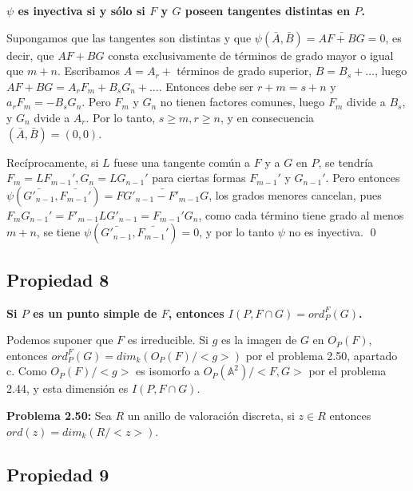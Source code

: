 \textbf{$\psi$ es inyectiva si y sólo si $F$ y $G$ poseen tangentes distintas en $P$.}

\begin{Dem}
  Supongamos que las tangentes son distintas y que $\psi(\bar{A},\bar{B}) = \bar{AF+BG}=0$, es decir, que $AF+BG$ consta exclusivamente de términos de grado mayor o igual que $m+n$. Escribamos $A=A_r+$ términos de grado superior, $B=B_s+\dots$, luego $AF+BG=A_rF_m+B_sG_n+\dots$. Entonces debe ser $r+m=s+n$ y $a_rF_m=-B_sG_n$. Pero $F_m$ y $G_n$ no tienen factores comunes, luego $F_m$ divide a $B_s$, y $G_n$ dvide a $A_r$. Por lo tanto, $s\ge m, r \ge n$, y en consecuencia $(\bar{A},\bar{B})=(0,0)$.

  Recíprocamente, si $L$ fuese una tangente común a $F$ y a $G$ en $P$, se tendría $F_m=LF_{m-1}',G_n=LG_{n-1}'$ para ciertas formas $F_{m-1}'$ y $G_{n-1}'$. Pero entonces $\psi(\bar{G'_{n-1}},\bar{F_{m-1}'})=\bar{FG'_{n-1}-F'_{m-1}G}$, los grados menores cancelan, pues $F_mG_{n-1}'=F'_{m-1}LG'_{n-1}=F_{m-1}'G_n$, como cada término tiene grado al menos $m+n$, se tiene $\psi(\bar{G'_{n-1}},\bar{F_{m-1}'})=0$, y por lo tanto $\psi$ no es inyectiva.  \qed
\end{Dem}

\subsection{Propiedad 8}

\textbf{Si $P$ es un punto simple de $F$, entonces $I(P,F\cap G)=ord_P^F(G)$. }

\begin{Dem}
  Podemos suponer que $F$ es irreducible. Si $g$ es la imagen de $G$ en $O_P(F)$, entonces $ord_P^F(G)=dim_k(O_P(F)/<g>)$ por el problema 2.50, apartado c. Como $O_P(F)/<g>$ es isomorfo a $O_P(\mathbb{A}^2)/<F,G>$ por el problema 2.44, y esta dimensión es $I(P,F\cap G)$.
  \begin{nota}
    \begin{itemize*}
    \item \textbf{Problema 2.50:} Sea $R$ un anillo de valoración discreta, si $z\in R$ entonces $ord(z)=dim_k(R/<z>)$. 
      \end{itemize*}
  \end{nota}
\end{Dem}


\subsection{Propiedad 9}

